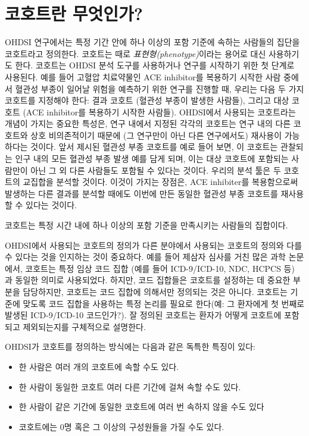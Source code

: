\documentclass[11pt]{book}
\providecommand{\tightlist}{%
  \setlength{\itemsep}{0pt}\setlength{\parskip}{0pt}}
\theoremstyle{definition}
\theoremstyle{definition}
\theoremstyle{definition}
\theoremstyle{remark}
\let\BeginKnitrBlock\begin \let\EndKnitrBlock\end
\begin{document}
\section{코호트란 무엇인가?}\label{-}

OHDSI 연구에서는 특정 기간 안에 하나 이상의 포함 기준에 속하는 사람들의
집단을 코호트라고 정의한다. 코호트는 때로 \emph{표현형(phenotype)}이라는
용어로 대신 사용하기도 한다. 코호트는 OHDSI 분석 도구를 사용하거나
연구를 시작하기 위한 첫 단계로 사용된다. 예를 들어 고혈압 치료약물인 ACE
inhibitor를 복용하기 시작한 사람 중에서 혈관성 부종이 일어날 위험을
예측하기 위한 연구를 진행할 때, 우리는 다음 두 가지 코호트를 지정해야
한다: 결과 코호트 (혈관성 부종이 발생한 사람들), 그리고 대상 코호트 (ACE
inhibitor를 복용하기 시작한 사람들). OHDSI에서 사용되는 코호트라는
개념이 가지는 중요한 특성은, 연구 내에서 지정된 각각의 코호트는 연구
내의 다른 코호트와 상호 비의존적이기 때문에 (그 연구만이 아닌 다른
연구에서도) 재사용이 가능하다는 것이다. 앞서 제시된 혈관성 부종 코호트를
예로 들어 보면, 이 코호트는 관찰되는 인구 내의 모든 혈관성 부종 발생
예를 담게 되며, 이는 대상 코호트에 포함되는 사람만이 아닌 그 외 다른
사람들도 포함될 수 있다는 것이다. 우리의 분석 툴은 두 코호트의 교집합을
분석할 것이다. 이것이 가지는 장점은, ACE inhibiter를 복용함으로써
발생하는 다른 결과를 분석할 때에도 이번에 만든 동일한 혈관성 부종
코호트를 재사용할 수 있다는 것이다.

\BeginKnitrBlock{rmdimportant}
코호트는 특정 시간 내에 하나 이상의 포함 기준을 만족시키는 사람들의
집합이다.
\EndKnitrBlock{rmdimportant}

  OHDSI에서 사용되는 코호트의
정의가 다른 분야에서 사용되는 코호트의 정의와 다를 수 있다는 것을
인지하는 것이 중요하다. 예를 들어 제삼자 심사를 거친 많은 과학 논문에서,
코호트는 특정 임상 코드 집합 (예를 들어 ICD-9/ICD-10, NDC, HCPCS 등) 과
동일한 의미로 사용되었다. 하지만, 코드 집합들은 코호트를 설정하는 데
중요한 부분을 담당하지만, 코호트는 코드 집합에 의해서만 정의되는 것은
아니다. 코호트는 기준에 맞도록 코드 집합을 사용하는 특정 논리를 필요로
한다(예: 그 환자에게 첫 번째로 발생된 ICD-9/ICD-10 코드인가?). 잘 정의된
코호트는 환자가 어떻게 코호트에 포함되고 제외되는지를 구체적으로
설명한다. 

 OHDSI가 코호트를 정의하는 방식에는 다음과 같은 독특한
특징이 있다:

\begin{itemize}
\tightlist
\item
  한 사람은 여러 개의 코호트에 속할 수도 있다.
\item
  한 사람이 동일한 코호트 여러 다른 기간에 걸쳐 속할 수도 있다.
\item
  한 사람이 같은 기간에 동일한 코호트에 여러 번 속하지 않을 수도 있다
\item
  코호트에는 0명 혹은 그 이상의 구성원들을 가질 수도 있다.
\end{itemize}
\end{document}
